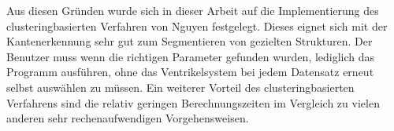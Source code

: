 Aus diesen Gründen wurde sich in dieser Arbeit auf die Implementierung des clusteringbasierten Verfahren von Nguyen \cite{nguyen2012clustering} festgelegt. Dieses eignet sich mit der Kantenerkennung sehr gut zum Segmentieren von gezielten Strukturen.
Der Benutzer muss wenn die richtigen Parameter gefunden wurden, lediglich das Programm ausführen, ohne das Ventrikelsystem bei jedem Datensatz erneut selbst auswählen zu müssen.
Ein weiterer Vorteil des clusteringbasierten Verfahrens sind die relativ geringen Berechnungszeiten im Vergleich zu vielen anderen sehr rechenaufwendigen Vorgehensweisen. 























































